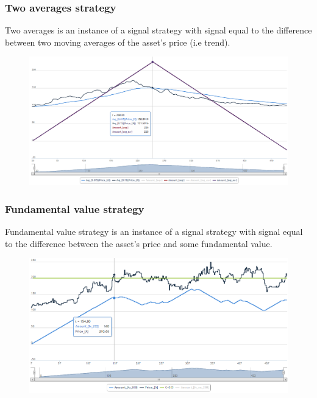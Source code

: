 \documentclass{beamer}
\begin{document}
\begin{frame}
\frametitle{Two averages strategy}
Two averages is an instance of a signal strategy with signal equal to the difference between two moving averages of the asset's price (i.e trend).
\begin{figure}[htbp]
\centering
\includegraphics[width=1\linewidth]{twoaverages.png}
\end{figure}
\end{frame}

\begin{frame}
\frametitle{Fundamental value strategy}
Fundamental value strategy is an instance of a signal strategy with signal equal to the difference between the asset's price and some fundamental value.
\begin{figure}[htbp]
\centering
\includegraphics[width=1\linewidth]{fundamentalvalue.png}
\end{figure}
\end{frame}
\end{document}
